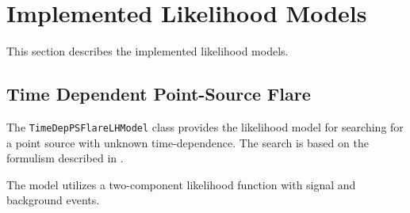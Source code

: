 \documentclass{article}
\newcommand{\code}[1]{\texttt{#1}}
\newcommand{\class}[1]{\colorbox{blue!30}{\code{#1}}}
\begin{document}
\section{Implemented Likelihood Models}
This section describes the implemented likelihood models.

\subsection{Time Dependent Point-Source Flare}

The \class{TimeDepPSFlareLHModel} class provides the likelihood model for searching for a point source with unknown time-dependence.
The search is based on the formulism described in \cite{TimeDepPSSearchMethods2010}.

The model utilizes a two-component likelihood function with signal and background events.



\end{document}
